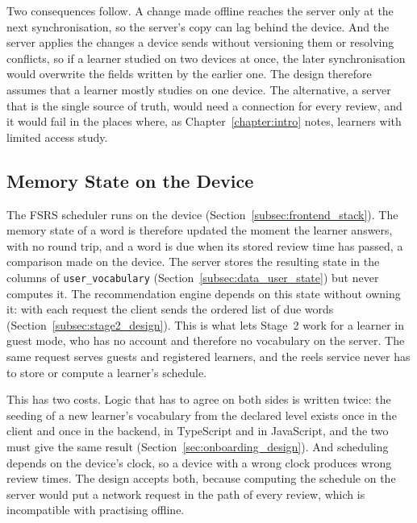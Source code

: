     Two consequences follow. A change made offline reaches the server only at the next synchronisation, so the server's copy can lag behind the device. And the server applies the changes a device sends without versioning them or resolving conflicts, so if a learner studied on two devices at once, the later synchronisation would overwrite the fields written by the earlier one. The design therefore assumes that a learner mostly studies on one device. The alternative, a server that is the single source of truth, would need a connection for every review, and it would fail in the places where, as Chapter~\ref{chapter:intro} notes, learners with limited access study.

    \subsection{Memory State on the Device}
    \label{subsec:on_device_memory_design}
    The FSRS scheduler runs on the device (Section~\ref{subsec:frontend_stack}). The memory state of a word is therefore updated the moment the learner answers, with no round trip, and a word is due when its stored review time has passed, a comparison made on the device. The server stores the resulting state in the columns of \texttt{user\_vocabulary} (Section~\ref{subsec:data_user_state}) but never computes it. The recommendation engine depends on this state without owning it: with each request the client sends the ordered list of due words (Section~\ref{subsec:stage2_design}). This is what lets Stage~2 work for a learner in guest mode, who has no account and therefore no vocabulary on the server. The same request serves guests and registered learners, and the reels service never has to store or compute a learner's schedule.

    This has two costs. Logic that has to agree on both sides is written twice: the seeding of a new learner's vocabulary from the declared level exists once in the client and once in the backend, in TypeScript and in JavaScript, and the two must give the same result (Section~\ref{sec:onboarding_design}). And scheduling depends on the device's clock, so a device with a wrong clock produces wrong review times. The design accepts both, because computing the schedule on the server would put a network request in the path of every review, which is incompatible with practising offline.

\newpage
